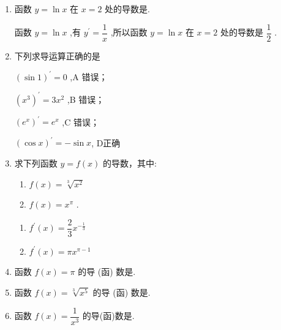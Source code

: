 \begin{enumerate}
    \item 函数 $y = \ln x$ 在 $x = 2$ 处的导数是.
    \begin{jieda}
        函数 $y = \ln x$ ,有 ${y}^{\prime } = \dfrac{1}{x}$ ,所以函数 $y = \ln x$ 在 $x = 2$ 处的导数是 $\dfrac{1}{2}$ .
    \end{jieda}
    
    \item 下列求导运算正确的是
    \begin{jieda}
        ${\left( \sin 1\right) }^{\prime } = 0$ ,A 错误； 
        
        ${\left( {x}^{3}\right) }^{\prime } = 3{x}^{2}$ ,B 错误； 
        
        ${\left( {{e}}^{x}\right) }^{\prime } = {{e}}^{x}$ ,C 错误； 
        
        ${\left( \cos x\right) }^{\prime } =  - \sin x$, D正确
    \end{jieda}
    
    \item 求下列函数 $y = f\left( x\right)$ 的导数，其中:
    \begin{enumerate}
        \item $f\left( x\right)  = \sqrt[3]{{x}^{2}}$
        \item $f\left( x\right)  = {x}^{\pi }$ .
    \end{enumerate}
    \begin{jieda}
        \begin{enumerate}
            \item ${f}^{\prime }\left( x\right)  = \dfrac{2}{3}{x}^{-\frac{1}{3}}$
            \item ${f}^{\prime }\left( x\right)  = \pi {x}^{\pi  - 1}$
        \end{enumerate}
    \end{jieda}
    
    
    \item 函数 $f\left( x\right)  = \pi$ 的导 (函) 数是.
    
    \item 函数 $f\left( x\right)  = \sqrt[{3}]{{x}^{5}}$ 的导 (函) 数是.
    
    \item 函数 $f\left( x\right)  = \dfrac{1}{{x}^{3}}$ 的导(函)数是.
\end{enumerate}

